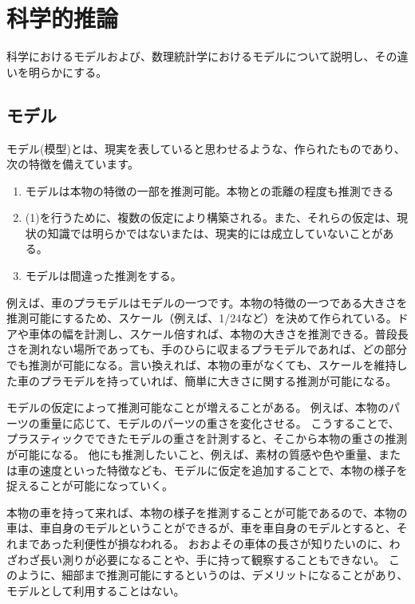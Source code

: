 \chapter{科学的推論}
科学におけるモデルおよび、数理統計学におけるモデルについて説明し、その違いを明らかにする。


\section{モデル}
モデル(模型)とは、現実を表していると思わせるような、作られたものであり、次の特徴を備えています。
\begin{enumerate}
    \item モデルは本物の特徴の一部を推測可能。本物との乖離の程度も推測できる
    \item (1)を行うために、複数の仮定により構築される。また、それらの仮定は、現状の知識では明らかではないまたは、現実的には成立していないことがある。
    \item モデルは間違った推測をする。
\end{enumerate}
  
例えば、車のプラモデルはモデルの一つです。本物の特徴の一つである大きさを推測可能にするため、スケール（例えば、1/24など）を決めて作られている。ドアや車体の幅を計測し、スケール倍すれば、本物の大きさを推測できる。普段長さを測れない場所であっても、手のひらに収まるプラモデルであれば、どの部分でも推測が可能になる。言い換えれば、本物の車がなくても、スケールを維持した車のプラモデルを持っていれば、簡単に大きさに関する推測が可能になる。



モデルの仮定によって推測可能なことが増えることがある。
例えば、本物のパーツの重量に応じて、モデルのパーツの重さを変化させる。
こうすることで、プラスティックでできたモデルの重さを計測すると、そこから本物の重さの推測が可能になる。
他にも推測したいこと、例えば、素材の質感や色や重量、または車の速度といった特徴なども、モデルに仮定を追加することで、本物の様子を捉えることが可能になっていく。
\fi

本物の車を持って来れば、本物の様子を推測することが可能であるので、本物の車は、車自身のモデルということができるが、車を車自身のモデルとすると、それまであった利便性が損なわれる。
おおよその車体の長さが知りたいのに、わざわざ長い測りが必要になることや、手に持って観察することもできない。
このように、細部まで推測可能にするというのは、デメリットになることがあり、モデルとして利用することはない。

